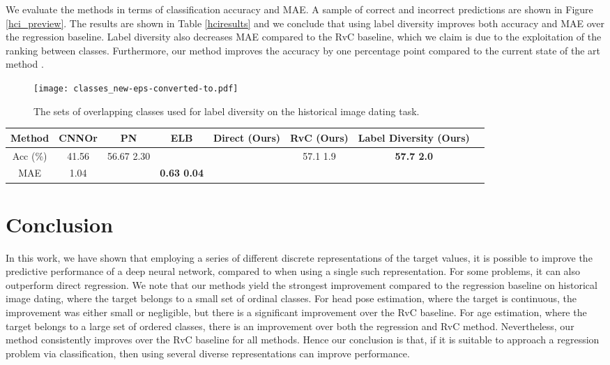 \documentclass[10pt, conference, a4paper]{IEEEtran}
\begin{document}
We evaluate the methods in terms of classification accuracy and MAE. A sample of correct and incorrect predictions are shown in Figure \ref{hci_preview}. The results are shown in Table \ref{hciresults} and we conclude that using label diversity improves both accuracy and MAE over the regression baseline. Label diversity also decreases MAE compared to the RvC baseline, which we claim is due to the exploitation of the ranking between classes. Furthermore, our method improves the accuracy by one percentage point compared to the current state of the art method \cite{belharbi2019deep}.

\begin{figure}[t]
  \centering
  \texttt{[image: classes\_new-eps-converted-to.pdf]}
  \caption{The sets of overlapping classes used for label diversity on the historical image dating task.}
  \label{hist_bins}
\end{figure}

\begin{table*}[t]
\renewcommand{\arraystretch}{1.3}
\caption{Accuracy and mean average error in decades for the different methods on the HCI dataset \cite{DBLP:conf/eccv/PalermoHE12}.}
\label{hciresults}
\centering
\begin{tabular}{c c c c c c c c}
\hline
Method & CNNOr \cite{liu2017deep}   & PN \cite{belharbi2019deep} & ELB \cite{belharbi2019deep} & Direct (Ours) & RvC (Ours) & Label Diversity (Ours)\\
\hline
Acc (\%) & 41.56 &  56.67  2.30 &  &  & 57.1  1.9 & \textbf{57.7  2.0}    \\
MAE & 1.04 &  & \textbf{0.63  0.04} &  &  &  \\ 
\hline
\end{tabular}
\end{table*}


\section{Conclusion}
In this work, we have shown that employing a series of different discrete representations of the target values, it is possible to improve the predictive performance of a deep neural network, compared to when using a single such representation. For some problems, it can also outperform direct regression. We note that our methods yield the strongest improvement compared to the regression baseline on historical image dating, where the target belongs to a small set of ordinal classes. For head pose estimation, where the target is continuous, the improvement was either small or negligible, but there is a significant improvement over the RvC baseline. For age estimation, where the target belongs to a large set of ordered classes, there is an improvement over both the regression and RvC method. Nevertheless, our method consistently improves over the RvC baseline for all methods. Hence our conclusion is that, if it is suitable to approach a regression problem via classification, then using several diverse representations can improve performance. 
\end{document}
